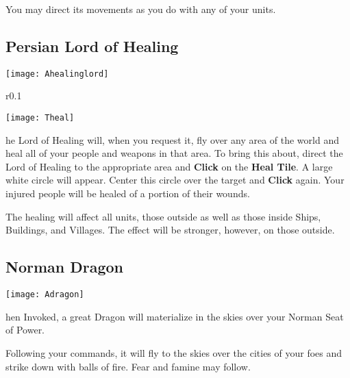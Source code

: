 You may direct its movements as you do with any of your units.

\subsection{\textsf{Persian Lord of Healing}}


\begin{center}
    \texttt{[image: Ahealinglord]}
\end{center}

\begin{wrapfigure}{r}{0.1\textwidth}
    \vspace{-20pt}
    \begin{center}
        \texttt{[image: Theal]}
    \end{center}
    \vspace{-20pt}
\end{wrapfigure}

he Lord of Healing will, when you request it, fly over any area of the world and heal all of your people and weapons in that area. To bring this about, direct the Lord of Healing to the appropriate area and \textbf{Click} on the \textbf{Heal Tile}. A large white circle will appear. Center this circle over the target and \textbf{Click} again. Your injured people will be healed of a portion of their wounds.

The healing will affect all units, those outside as well as those inside Ships, Buildings, and Villages. The effect will be stronger, however, on those outside.

\subsection{\textsf{Norman Dragon}}


\begin{center}
    \texttt{[image: Adragon]}
\end{center}

hen Invoked, a great Dragon will materialize in the skies over your Norman Seat of Power.


Following your commands, it will fly to the skies over the cities of your foes and strike down with balls of fire. Fear and famine may follow.

